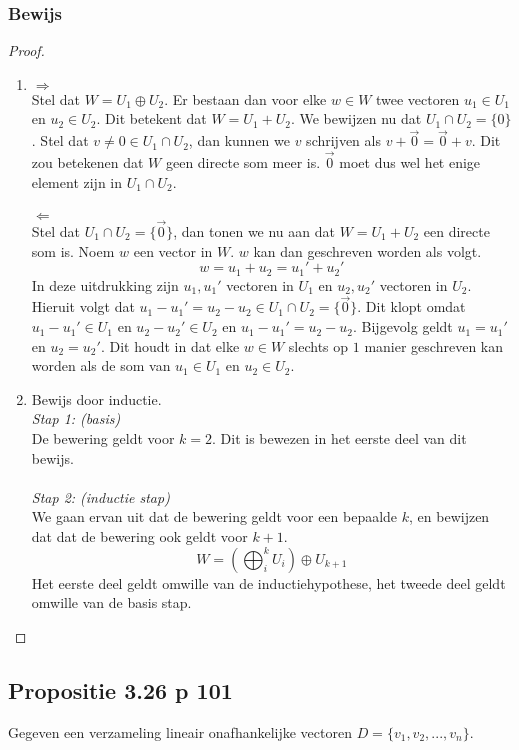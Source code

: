 \documentclass[lineaire_algebra_oplossingen.tex]{subfiles}
\begin{document}
\subsubsection*{Bewijs}
\begin{proof}
\begin{enumerate}7
\item
\emph{$\Rightarrow$}\\
Stel dat $W = U_1 \oplus U_2$.
Er bestaan dan voor elke $w\in W$ twee vectoren $u_1\in U_1$ en $u_2 \in U_2$.
Dit betekent dat $W = U_1+U_2$. We bewijzen nu dat $U_1\cap U_2 = \{0\}$.
Stel dat $v \neq 0 \in U_1\cap U_2$, dan kunnen we $v$ schrijven als $v+\vec{0}=\vec{0}+v$.
Dit zou betekenen dat $W$ geen directe som meer is.
$\vec{0}$ moet dus wel het enige element zijn in $U_1\cap U_2$.\\\\
\emph{$\Leftarrow$}\\
Stel dat $U_1\cap U_2 = \{\vec{0}\}$, dan tonen we nu aan dat $W = U_1+U_2$ een directe som is.
Noem $w$ een vector in $W$. $w$ kan dan geschreven worden als volgt.
\[
w = u_1+u_2=u_1'+u_2'
\]
In deze uitdrukking zijn $u_1,u_1'$ vectoren in $U_1$ en $u_2,u_2'$ vectoren in $U_2$.
Hieruit volgt dat $u_1-u_1'=u_2-u_2 \in U_1\cap U_2 = \{\vec{0}\}$.
Dit klopt omdat $u_1-u_1' \in U_1$ en $u_2-u_2' \in U_2$ en $u_1-u_1'=u_2-u_2$.
Bijgevolg geldt $u_1 = u_1'$ en $u_2=u_2'$.
Dit houdt in dat elke $w \in W$ slechts op $1$ manier geschreven kan worden als de som van $u_1\in U_1$ en $u_2\in U_2$.

\item
Bewijs door inductie.\\
\emph{Stap 1: (basis)}\\
De bewering geldt voor $k=2$. Dit is bewezen in het eerste deel van dit bewijs.\\\\
\emph{Stap 2: (inductie stap)}\\
We gaan ervan uit dat de bewering geldt voor een bepaalde $k$, en bewijzen dat dat de bewering ook geldt voor $k+1$.
\[
W = (\bigoplus_i^k U_i) \oplus U_{k+1}
\]
Het eerste deel geldt omwille van de inductiehypothese, het tweede deel geldt omwille van de basis stap.
\end{enumerate}
\end{proof}


\subsection{Propositie 3.26 p 101}
\label{3.26}
Gegeven een verzameling lineair onafhankelijke vectoren $D= \{v_1,v_2,...,v_n\}$.
\end{document}
